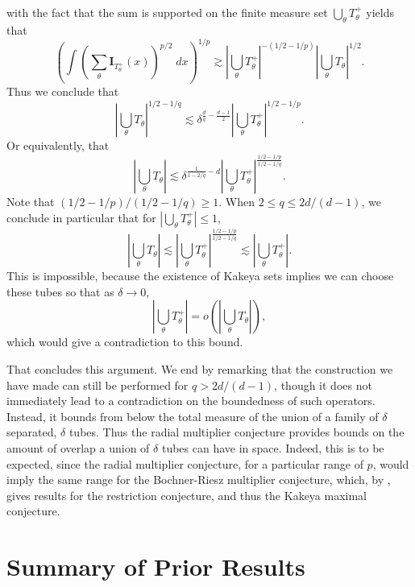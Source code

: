 %
with the fact that the sum is supported on the finite measure set $\bigcup_\theta T_\theta^+$ yields that
%
\[ \left( \int \left( \sum_\theta \mathbf{I}_{T_\theta^+}(x) \right)^{p/2}\; dx \right)^{1/p} \gtrsim \left| \bigcup_\theta T_\theta^+ \right|^{-(1/2 - 1/p)} \left| \bigcup_\theta T_\theta \right|^{1/2}. \]
%
Thus we conclude that
%
\[ \left| \bigcup_\theta T_\theta \right|^{1/2 - 1/q} \lesssim \delta^{ \frac{d}{q} - \frac{d-1}{2} } \left| \bigcup_\theta T_\theta^+ \right|^{1/2 - 1/p}. \]
%
Or equivalently, that
\[ \left| \bigcup_\theta T_\theta \right| \lesssim \delta^{ \frac{1}{1 - 2/q} - d } \left| \bigcup_\theta T_\theta^+ \right|^{\frac{1/2 - 1/p}{1/2 - 1/q}}. \]
%
Note that $(1/2 - 1/p) / (1/2 - 1/q) \geq 1$. When $2 \leq q \leq 2d/(d-1)$, we conclude in particular that for $|\bigcup_\theta T_\theta^+| \leq 1$,
%
\[ \left| \bigcup_\theta T_\theta \right| \lesssim \left| \bigcup_\theta T_\theta^+ \right|^{\frac{1/2 - 1/p}{1/2 - 1/q}} \lesssim \left| \bigcup_\theta T_\theta^+ \right|. \]
%
This is impossible, because the existence of Kakeya sets implies we can choose these tubes so that as $\delta \to 0$,
%
\[ \left| \bigcup_\theta T_\theta^+ \right| = o \left( \left| \bigcup_\theta T_\theta \right| \right), \]
%
which would give a contradiction to this bound.

That concludes this argument. We end by remarking that the construction we have made can still be performed for $q > 2d/(d-1)$, though it does not immediately lead to a contradiction on the boundedness of such operators. Instead, it bounds from below the total measure of the union of a family of $\delta$ separated, $\delta$ tubes. Thus the radial multiplier conjecture provides bounds on the amount of overlap a union of $\delta$ tubes can have in space. Indeed, this is to be expected, since the radial multiplier conjecture, for a particular range of $p$, would imply the same range for the Bochner-Riesz multiplier conjecture, which, by \cite{Tao}, gives results for the restriction conjecture, and thus the Kakeya maximal conjecture.

\section{Summary of Prior Results}

